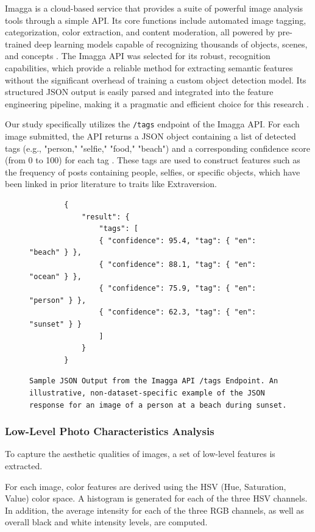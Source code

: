 Imagga is a cloud-based service that provides a suite of powerful image analysis tools through a simple API. Its core functions include automated image tagging, categorization, color extraction, and content moderation, all powered by pre-trained deep learning models capable of recognizing thousands of objects, scenes, and concepts \citep{imagga_website, imagga_solutions}. The Imagga API was selected for its robust, recognition capabilities, which provide a reliable method for extracting semantic features without the significant overhead of training a custom object detection model. Its structured JSON output is easily parsed and integrated into the feature engineering pipeline, making it a pragmatic and efficient choice for this research \citep{imagga_docs}.

Our study specifically utilizes the \texttt{/tags} endpoint of the Imagga API. For each image submitted, the API returns a JSON object containing a list of detected tags (e.g., "person," "selfie," "food," "beach") and a corresponding confidence score (from 0 to 100) for each tag \citep{imagga_docs}. These tags are used to construct features such as the frequency of posts containing people, selfies, or specific objects, which have been linked in prior literature to traits like Extraversion.

\begin{figure}[H]
	\centering
	\begin{verbatim}
		{
			"result": {
				"tags": [
				{ "confidence": 95.4, "tag": { "en": "beach" } },
				{ "confidence": 88.1, "tag": { "en": "ocean" } },
				{ "confidence": 75.9, "tag": { "en": "person" } },
				{ "confidence": 62.3, "tag": { "en": "sunset" } }
				]
			}
		}
	\end{verbatim}
	\caption{ \texttt{Sample JSON Output from the Imagga API /tags Endpoint. An illustrative, non-dataset-specific example of the JSON response for an image of a person at a beach during sunset.}}
	\label{fig:imagga_json}
\end{figure}

\subsubsection{Low-Level Photo Characteristics Analysis}
To capture the aesthetic qualities of images, a set of low-level features is extracted.

For each image, color features are derived using the HSV (Hue, Saturation, Value) color space. A histogram is generated for each of the three HSV channels. In addition, the average intensity for each of the three RGB channels, as well as overall black and white intensity levels, are computed.

